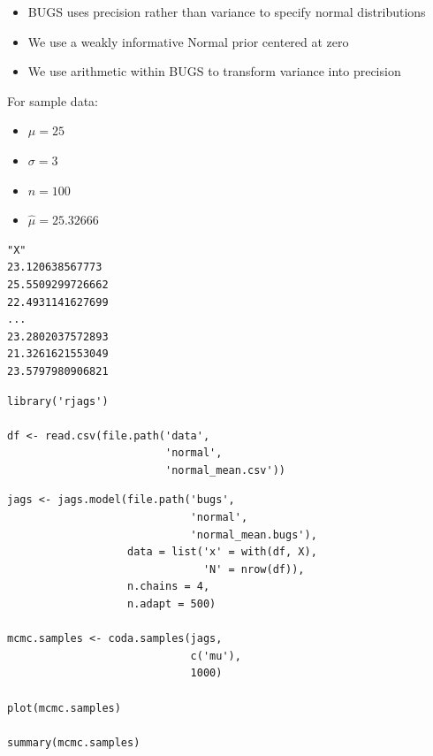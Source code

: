 \documentclass{beamer}
\begin{document}
\begin{frame}[fragile]
  \begin{itemize}
    \item{BUGS uses precision rather than variance to specify normal distributions}
    \item{We use a weakly informative Normal prior centered at zero}
    \item{We use arithmetic within BUGS to transform variance into precision}
  \end{itemize}
\end{frame}

\begin{frame}[fragile]
  For sample data:
  \begin{itemize}
    \item{$\mu = 25$}
    \item{$\sigma = 3$}
    \item{$n = 100$}
    \item{$\hat{\mu} = 25.32666$}
  \end{itemize}
\end{frame}

\begin{frame}[fragile]
  \begin{verbatim}
"X"
23.120638567773
25.5509299726662
22.4931141627699
...
23.2802037572893
21.3261621553049
23.5797980906821
  \end{verbatim}
\end{frame}


\begin{frame}[fragile]
  \begin{verbatim}
library('rjags')

df <- read.csv(file.path('data',
                         'normal',
                         'normal_mean.csv'))
  \end{verbatim}
\end{frame}

\begin{frame}[fragile]
  \begin{verbatim}
jags <- jags.model(file.path('bugs',
                             'normal',
                             'normal_mean.bugs'),
                   data = list('x' = with(df, X),
                               'N' = nrow(df)),
                   n.chains = 4,
                   n.adapt = 500)
                   
mcmc.samples <- coda.samples(jags,
                             c('mu'),
                             1000)

plot(mcmc.samples)

summary(mcmc.samples)
  \end{verbatim}
\end{frame}
\end{document}
